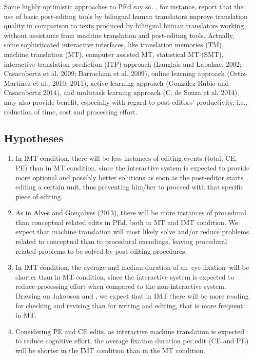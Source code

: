 \documentclass[output=paper]{langsci/langscibook}
\begin{document}
Some highly optimistic approaches to PEd say so. \citet{GreenEtAl2013}, for instance, report that the use of basic post-editing tools by bilingual human translators improve translation quality in comparison to texts produced by bilingual human translators working without assistance from machine translation and post-editing tools. Actually, some sophisticated interactive interfaces, like translation memories (TM), machine translation (MT), computer assisted MT, statistical MT (SMT), interactive translation prediction (ITP) approach (Langlais and Lapalme, 2002; Casacuberta et al. 2009; Barrachina et al. 2009), online learning approach (Ortiz-Martínez et al., 2010; 2011), active learning approach (González-Rubio and Casacuberta 2014), and multitask learning approach (C. de Souza et al, 2014), may also provide benefit, especially with regard to post-editors’ productivity, i.e., reduction of time, cost and processing effort.


\subsection{Hypotheses}

\begin{enumerate}
\item In IMT condition, there will be less instances of editing events (total, CE, PE) than in MT condition, since the interactive system is expected to provide more optional and possibly better solutions as soon as the post-editor starts editing a certain unit, thus preventing him/her to proceed with that specific piece of editing.
\item As in Alves and Gonçalves (2013), there will be more instances of procedural than conceptual related edits in PEd, both in MT and IMT condition. We expect that machine translation will most likely solve and/or reduce problems related to conceptual than to procedural encodings, leaving procedural related problems to be solved by post-editing procedures.
\item In IMT condition, the average and median duration of an~eye-fixation~will be shorter than in MT condition, since the interactive system is expected to reduce processing effort when compared to the non-interactive system. Drawing on Jakobson and \citet{Jensen2008}, we expect that in IMT there will be more reading for checking and revising than for writing and editing, that is more frequent in MT.
\item Considering PE and CE edits, as interactive machine translation is expected to reduce cognitive effort, the average fixation duration per edit (CE and PE) will be shorter in the IMT condition than in the MT condition.
\end{enumerate}
\end{document}
